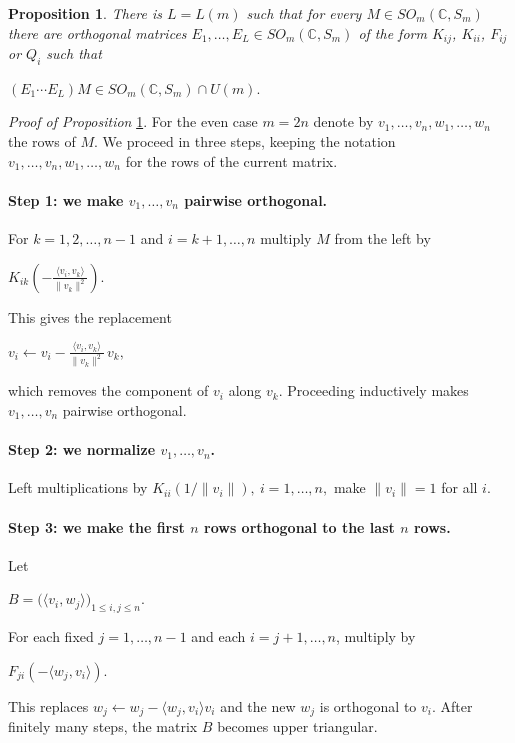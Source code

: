 \documentclass[11pt]{amsart}
\newtheorem{proposition}[theorem]{Proposition}
\theoremstyle{definition}
\theoremstyle{remark}
\theoremstyle{remark}
\begin{document}
\begin{proposition}%
\label{theo-GS}
There is $L = L(m)$ such that for every $M\in SO_{m}(\mathbb{C}, S_m)$ there are orthogonal matrices $E_1, \dots,  E_L \in SO_{m}(\mathbb{C}, S_m)$  of the form $K_{ij}$, $K_{ii}$, $F_{ij}$ or $Q_i$ 
such that
\begin{center}
$(E_1\cdots E_L)M \in SO_{m}(\mathbb{C}, S_m)\cap U(m).$
\end{center}
\end{proposition}

\noindent \textit{Proof of Proposition} \ref{theo-GS}.
For the even case $m = 2n$ denote by $v_1,\dots,v_n,w_1,\dots,w_n$ the rows of $M$. 
We proceed in three steps, keeping the notation $v_1,\dots,v_n,w_1,\dots,w_n$ for the rows of the current matrix.

\paragraph{\textbf{Step 1}: we make $v_1,\dots,v_n$ pairwise orthogonal.}
For $k=1,2,\dots,n-1$ and $i=k+1,\dots,n$ multiply $M$ from the left by
\begin{center}
$K_{ik}\!\left(-\frac{\langle v_i,v_k\rangle}{\|v_k\|^2}\right).$
\end{center}
This gives the replacement
\begin{center}
$v_i\leftarrow v_i-\frac{\langle v_i,v_k\rangle}{\|v_k\|^2}\,v_k,$
\end{center}
which removes the component of $v_i$ along $v_k$. Proceeding inductively makes $v_1,\dots,v_n$
pairwise orthogonal.

\paragraph{\textbf{Step 2}: we normalize $v_1,\dots,v_n$.}
Left multiplications by $K_{ii}(1/\|v_i\|),\ i=1,\dots,n,$
make $\|v_i\|=1$ for all $i$. %

\paragraph{\textbf{Step 3}: we make the first $n$ rows orthogonal to the last $n$ rows.}
Let
\begin{center}
$B=\bigl(\langle v_i,w_j\rangle\bigr)_{1\le i,j\le n}.$
\end{center}
For each fixed $j=1,\dots,n-1$ and each $i=j+1,\dots,n$, multiply by
\begin{center}
    $F_{ji}\!\left(-\langle w_j,v_i\rangle\right).$
\end{center}
This replaces $w_j\leftarrow w_j-\langle w_j,v_i\rangle v_i$ and the new $w_j$ is orthogonal to $v_i$. After finitely many steps, the matrix $B$ becomes upper triangular.
\end{document}
